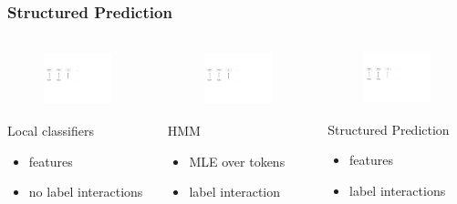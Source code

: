 \documentclass[10pt]{beamer}
\begin{document}
\begin{frame}[t]
\frametitle{Structured Prediction}

\begin{columns}[t]
	
	\begin{column}{.3\textwidth}

	\begin{figure}[t]
		\centering
			\includegraphics[height=1.6cm, page=1]{figures/local.pdf}
	\end{figure}
	
	Local classifiers
	\small
	\vspace{0.35cm}
	\begin{itemize}
		\item features 
		\item no label interactions
	\end{itemize}
\end{column}

\begin{column}{.3\textwidth}


	\begin{figure}[t]
		\centering
			\includegraphics[height=1.6cm, page=2]{figures/local.pdf}
	\end{figure}

	HMM
	
	\small
	\begin{itemize}
		\item MLE over tokens 
		\item label interaction
	\end{itemize}
\end{column}


\begin{column}{.3\textwidth}
	\begin{figure}[t]
		\centering
			\includegraphics[height=1.56cm, page=3]{figures/local.pdf}
	\end{figure}

	Structured Prediction
	
	\small
	\begin{itemize}
		\item features
		\item label interactions
	\end{itemize}
\end{column}


\end{columns}





\end{frame}
\end{document}
